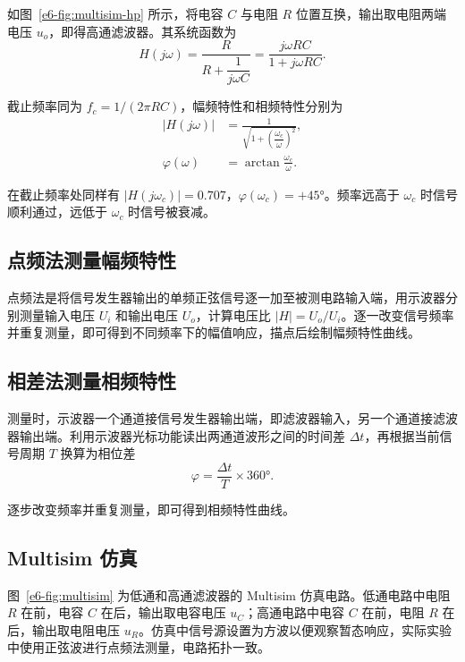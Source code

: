如图~\ref{e6-fig:multisim-hp} 所示，将电容 \(C\) 与电阻 \(R\) 位置互换，输出取电阻两端电压 \(u_o\)，即得高通滤波器。其系统函数为
\begin{equation}
    H(j\omega) = \frac{R}{R+\dfrac{1}{j\omega C}}
    = \frac{j\omega RC}{1+j\omega RC}.
    \label{e6-eq:hp-tf}
\end{equation}

截止频率同为 \(f_c = 1/(2\pi RC)\)，幅频特性和相频特性分别为
\begin{align}
    |H(j\omega)| &= \frac{1}{\sqrt{1+\left(\dfrac{\omega_c}{\omega}\right)^{\!2}}}, \label{e6-eq:hp-mag} \\[6pt]
    \varphi(\omega) &= \arctan\frac{\omega_c}{\omega}. \label{e6-eq:hp-phase}
\end{align}

在截止频率处同样有 \(|H(j\omega_c)|=0.707\)，\(\varphi(\omega_c)=+45°\)。频率远高于 \(\omega_c\) 时信号顺利通过，远低于 \(\omega_c\) 时信号被衰减。

\subsection{点频法测量幅频特性}

点频法是将信号发生器输出的单频正弦信号逐一加至被测电路输入端，用示波器分别测量输入电压 \(U_i\) 和输出电压 \(U_o\)，计算电压比 \(|H|=U_o/U_i\)。逐一改变信号频率并重复测量，即可得到不同频率下的幅值响应，描点后绘制幅频特性曲线。

\subsection{相差法测量相频特性}

测量时，示波器一个通道接信号发生器输出端，即滤波器输入，另一个通道接滤波器输出端。利用示波器光标功能读出两通道波形之间的时间差 \(\Delta t\)，再根据当前信号周期 \(T\) 换算为相位差
\begin{equation}
    \varphi = \frac{\Delta t}{T}\times 360°.
    \label{e6-eq:phase-diff}
\end{equation}

逐步改变频率并重复测量，即可得到相频特性曲线。

\subsection{Multisim 仿真}

图~\ref{e6-fig:multisim} 为低通和高通滤波器的 Multisim 仿真电路。低通电路中电阻 \(R\) 在前，电容 \(C\) 在后，输出取电容电压 \(u_C\)；高通电路中电容 \(C\) 在前，电阻 \(R\) 在后，输出取电阻电压 \(u_R\)。仿真中信号源设置为方波以便观察暂态响应，实际实验中使用正弦波进行点频法测量，电路拓扑一致。

